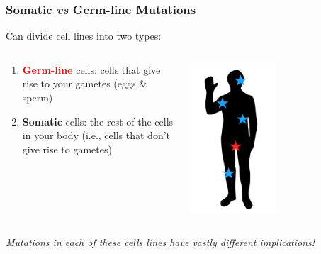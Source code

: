 \documentclass[10pt]{beamer}
\begin{document}
\begin{frame}[t]
\frametitle{Somatic \emph{vs} Germ-line Mutations}
\vspace{0.25cm}

	Can divide cell lines into two types:\\
		\smallskip
	
		\begin{columns}
			\begin{column}{0.5\textwidth}
				\begin{enumerate}
					\item \textbf{\textcolor{red}{Germ-line}} cells: cells that give rise to your gametes (eggs \& sperm)
					\smallskip
					\item \textbf{\textcolor{myblue}{Somatic}} cells: the rest of the cells in your body (i.e., cells that don't give rise to gametes)
				\end{enumerate}
			\end{column}
			
			\begin{column}{0.5\textwidth}
				\centerline{\includegraphics[width=0.5\textwidth]{figures/mutation-types.png}}
			\end{column}
		\end{columns}	
	
	\vspace{0.5cm}
	
	\begin{center}
		\textcolor{myblue}{\emph{Mutations in each of these cells lines have vastly different implications!}}
	\end{center}
\end{frame}
\end{document}
